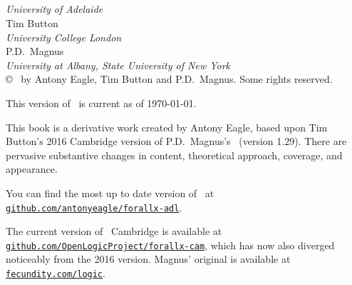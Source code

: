 \begin{titlingpage}

~\\[4cm]
\begin{center}\forallxadl \end{center}\end{titlingpage}

\newpage \thispagestyle{empty} ~\\
~\\[2cm]
\noindent {}

\vfill


\\
\emph{University of Adelaide}\\[1.5cm]

{Tim Button}\\
\emph{University College London}\\[1.5cm]

{P.D.\ Magnus}\\
\emph{University at Albany, State University of New York}
\newpage \thispagestyle{empty} ~\\
\copyright\  by Antony Eagle, Tim Button and P.D.\ Magnus. Some rights reserved.

This version of \forallxadl\ is current as of \today.

\medskip\thispagestyle{empty}%

This book is a derivative work created by Antony Eagle, based upon Tim Button's 2016 Cambridge version of P.D.\ Magnus's \forallx\ (version 1.29). There are pervasive substantive changes in content, theoretical approach, coverage, and appearance. 

You can find the most up to date version of \forallxadl\ at \href{https://github.com/antonyeagle/forallx-adl}{\nolinkurl{github.com/antonyeagle/forallx-adl}}. 

The current version of \forallx\ Cambridge is available at \href{https://github.com/OpenLogicProject/forallx-cam}{\nolinkurl{github.com/OpenLogicProject/forallx-cam}}, which has now also diverged noticeably from the 2016 version. Magnus' original is available at \href{http://fecundity.com/logic}{\nolinkurl{fecundity.com/logic}}. 

